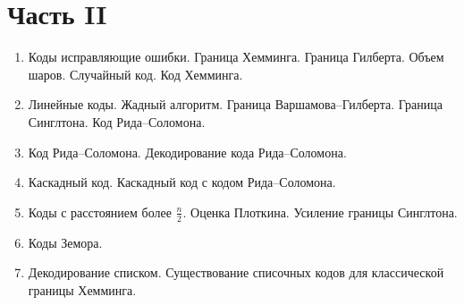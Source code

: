 \section*{Часть II}
\begin{enumerate}
    \item Коды исправляющие ошибки. Граница Хемминга. Граница Гилберта. Объем шаров. Случайный
        код. Код Хемминга.
    \item Линейные коды. Жадный алгоритм. Граница Варшамова--Гилберта. Граница Синглтона. Код
        Рида--Соломона.
    \item Код Рида--Соломона. Декодирование кода Рида--Соломона.
    \item Каскадный код. Каскадный код с кодом Рида--Соломона.
    \item Коды с расстоянием более $\frac{n}{2}$. Оценка Плоткина. Усиление границы Синглтона.
    \item Коды Земора.
    \item Декодирование списком. Существование списочных кодов для классической границы Хемминга.
\end{enumerate}





